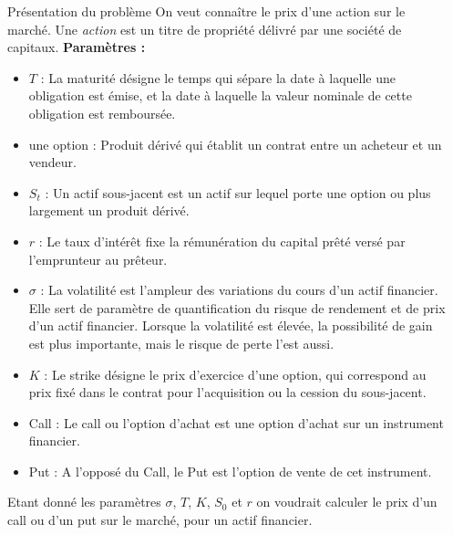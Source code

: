\documentclass[final]{beamer}
\newlength{\sepwid}
\newlength{\onecolwid}
\begin{document}
\begin{frame}[t]
\begin{columns}[t]
\begin{column}{\onecolwid}
\begin{block}{Présentation du problème}
  On veut connaître le prix d'une action sur le marché. Une \textit{action} est un titre de propriété délivré par une société de capitaux. \newline
  \textbf{Paramètres :}
  \begin{itemize}
    \item $T$ : La maturité désigne le temps qui sépare la date à laquelle une obligation est émise, et la date à laquelle la valeur nominale de cette obligation est remboursée.
    \item une option :  Produit dérivé qui établit un contrat entre un acheteur et un vendeur.
    \item $S_t$ : Un actif sous-jacent est un actif sur lequel porte une option ou plus largement un produit dérivé.
    \item $r$ : Le taux d'intérêt fixe la rémunération du capital prêté versé par l'emprunteur au prêteur.
    \item $\sigma$ : La volatilité est l'ampleur des variations du cours d'un actif financier. Elle sert de paramètre de quantification du risque de rendement et de prix d'un actif financier. \newline Lorsque la volatilité est élevée, la possibilité de gain est plus importante, mais le risque de perte l'est aussi.
    \item $K$ : Le strike désigne le prix d'exercice d'une option, qui correspond au prix fixé dans le contrat pour l’acquisition ou la cession du sous-jacent.
    \item Call : Le call ou l'option d'achat est une option d'achat sur un instrument financier.
    \item Put : A l'opposé du Call, le Put est l'option de vente de cet instrument.
  \end{itemize}
  Etant donné les paramètres $\sigma$, $T$, $K$, $S_0$ et $r$ on voudrait calculer le prix d'un call ou d'un put sur le marché, pour un actif financier.
\end{block}




\end{column} %

\begin{column}{\sepwid}\end{column} %


\end{columns}
\end{frame}
\end{document}
